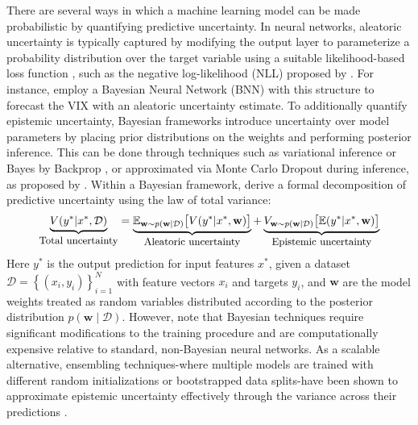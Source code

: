There are several ways in which a machine learning model can be made probabilistic by quantifying predictive uncertainty. In neural networks, aleatoric uncertainty is typically captured by modifying the output layer to parameterize a probability distribution over the target variable using a suitable likelihood-based loss function \parencite{jospin2022hands}, such as the negative log-likelihood (NLL) proposed by \textcite{lakshminarayanan2017simple}. For instance, \textcite{Horta2024} employ a Bayesian Neural Network (BNN) with this structure to forecast the VIX with an aleatoric uncertainty estimate. To additionally quantify epistemic uncertainty, Bayesian frameworks introduce uncertainty over model parameters by placing prior distributions on the weights and performing posterior inference. This can be done through techniques such as variational inference or Bayes by Backprop \parencite{blundell2015weight, kendall2017uncertainties}, or approximated via Monte Carlo Dropout during inference, as proposed by \textcite{gal2016dropout}. Within a Bayesian framework, \textcite{depeweg2018uncertainty_decomposition} derive a formal decomposition of predictive uncertainty using the law of total variance: \begin{equation}
    \begin{gathered} \underbrace{V(y^*|x^*,\mathcal{D})}_{\displaystyle\text{\small Total uncertainty}} =
    \underbrace{\mathbb{E}_{\mathbf{w}\sim p(\mathbf{w}|\mathcal{D})}\big[V(y^*| x^*,\mathbf{w})\big]}_{\displaystyle\text{\small Aleatoric uncertainty}}+
    \underbrace{V_{\mathbf{w}\sim p(\mathbf{w}|\mathcal{D})}\big[\mathbb{E}(y^*| x^*,\mathbf{w})\big]}_{\displaystyle\text{\small Epistemic uncertainty}}
    \end{gathered}
\end{equation}
Here $y^*$ is the output prediction for input features $x^*$, given a dataset $\mathcal{D}=\left\{(x_i, y_i)\right\}_{i=1}^{N}$ with feature vectors $x_i$ and targets $y_i$, and $\mathbf{w}$ are the model weights treated as random variables distributed according to the posterior distribution $p(\mathbf{w} \mid \mathcal{D}).$ However, \textcite{lakshminarayanan2017simple} note that Bayesian techniques require significant modifications to the training procedure and are computationally expensive relative to standard, non-Bayesian neural networks. As a scalable alternative, ensembling techniques-where multiple models are trained with different random initializations or bootstrapped data splits-have been shown to approximate epistemic uncertainty effectively through the variance across their predictions \parencite{liu2019accurate, wang2025aleatoric, Berry2023decomposeALandEP}. 

